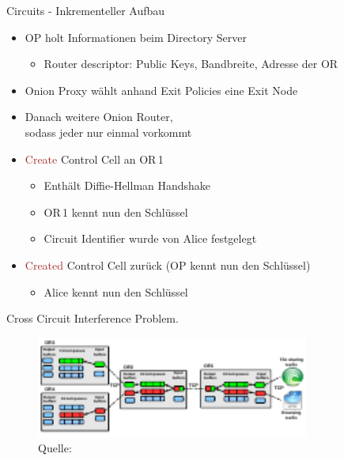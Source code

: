\documentclass{beamer}
\begin{document}
 
\begin{frame}{Circuits - Inkrementeller Aufbau}

  {
    \begin{itemize}
      \item OP holt Informationen beim Directory Server 
      \begin{itemize}
	\item Router descriptor: Public Keys, Bandbreite, Adresse der OR
      \end{itemize}      
      \item Onion Proxy wählt anhand Exit Policies eine Exit Node
      \item Danach weitere Onion Router,\\ sodass jeder nur einmal vorkommt
    \end{itemize}
  }
  
  {
    \begin{itemize}
      \item \textcolor{brown}{Create} Control Cell an OR\,1
	\begin{itemize}
	  \item Enthält Diffie-Hellman Handshake
	  \item OR\,1 kennt nun den Schlüssel
	  \item Circuit Identifier wurde von Alice festgelegt
	\end{itemize}
      \item \textcolor{brown}{Created} Control Cell zurück (OP kennt nun den Schlüssel)
	\begin{itemize}
	  \item Alice kennt nun den Schlüssel
	\end{itemize}
    \end{itemize}
    \begin{figure}
    \end{figure}
  }
\end{frame}


\begin{frame}{Cross Circuit Interference Problem.}
  \begin{figure}
    \includegraphics[width=0.8\textwidth]{pics/BufferPic.pdf}
    \caption{ Quelle: \cite{pctcp}}
  \end{figure} 
\end{frame}
\end{document}
